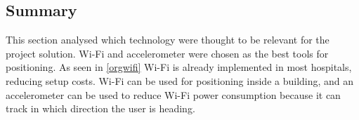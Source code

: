 












\subsection{Summary}
This section analysed which technology were thought to be relevant for the project solution. Wi-Fi and accelerometer were chosen as the best tools for positioning. As seen in \cref{orgwifi} Wi-Fi is already implemented in most hospitals, reducing setup costs. Wi-Fi can be used for positioning inside a building, and an accelerometer can be used to reduce Wi-Fi power consumption because it can track in which direction the user is heading.
 
%